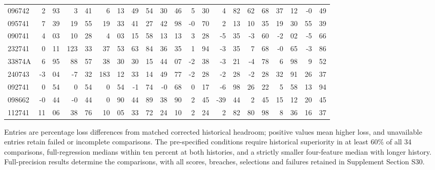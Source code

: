 \begin{table}[t]
{\begin{tabular}{l*{10}{r@{.}l}}
096742 & 2 & 93 & 3 & 41 & 6 & 13 & 49 & 54 & 30 & 46 & 5 & 30 & 4 & 82 & 62 & 68 & 37 & 12 & -0 & 49 \\
095741 & 7 & 39 & 19 & 55 & 19 & 33 & 41 & 27 & 42 & 98 & -0 & 70 & 2 & 13 & 10 & 35 & 19 & 30 & 55 & 39 \\
090741 & 4 & 03 & 10 & 28 & 4 & 03 & 15 & 58 & 13 & 13 & 3 & 28 & -5 & 35 & -3 & 60 & -2 & 02 & -5 & 66 \\
232741 & 0 & 11 & 123 & 33 & 37 & 53 & 63 & 84 & 36 & 35 & 1 & 94 & -3 & 35 & 7 & 68 & -0 & 65 & -3 & 86 \\
33874A & 6 & 95 & 88 & 57 & 38 & 30 & 30 & 15 & 44 & 07 & -2 & 38 & -3 & 21 & -4 & 78 & 6 & 98 & 9 & 52 \\
240743 & -3 & 04 & -7 & 32 & 183 & 12 & 33 & 14 & 49 & 77 & -2 & 28 & -2 & 28 & -2 & 28 & 32 & 91 & 26 & 37 \\
092741 & 0 & 54 & 0 & 54 & 0 & 54 & -1 & 74 & -0 & 68 & 0 & 17 & -6 & 98 & 26 & 22 & 5 & 58 & 13 & 94 \\
098662 & -0 & 44 & -0 & 44 & 0 & 90 & 44 & 89 & 38 & 90 & 2 & 45 & -39 & 44 & 2 & 45 & 15 & 12 & 20 & 45 \\
112741 & 11 & 06 & 38 & 76 & 10 & 05 & 33 & 72 & 24 & 10 & 2 & 24 & 2 & 82 & 80 & 98 & 8 & 36 & 16 & 37 \\
\bottomrule\end{tabular}}
\par\vspace{2pt}\begin{minipage}{.98\linewidth}\footnotesize
Entries are percentage loss differences from matched corrected historical headroom; positive values mean higher loss, and unavailable entries retain failed or incomplete comparisons.
The pre-specified conditions require historical superiority in at least 60\% of all 34 comparisons, full-regression medians within ten percent at both histories, and a strictly smaller four-feature median with longer history.
Full-precision results determine the comparisons, with all scores, breaches, selections and failures retained in Supplement Section S30.
\end{minipage}\end{table}
